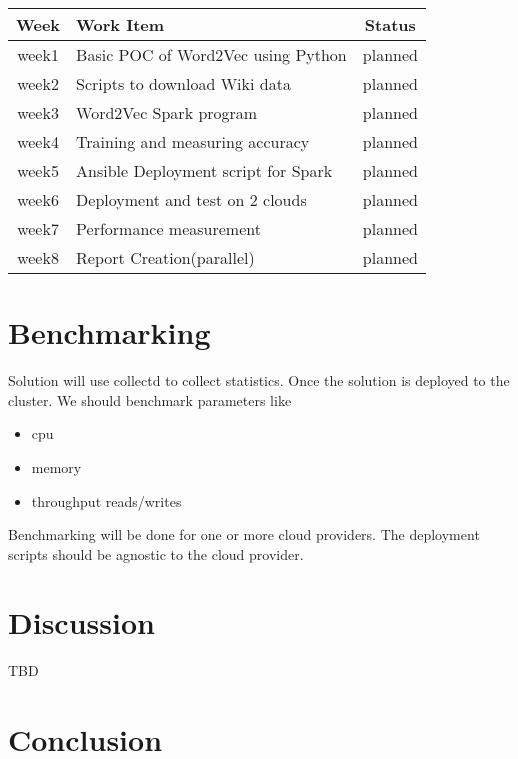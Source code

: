 \documentclass[9pt,twocolumn,twoside]{../../styles/osajnl}
\begin{document}
\begin{center}
\begin{tabular}{ |c|l|c| } 
 \hline
Week & Work Item & Status \\
\hline
week1 & Basic POC of Word2Vec using Python  & planned \\ 
week2 & Scripts to download Wiki data & planned \\ 
week3 & Word2Vec Spark program & planned \\ 
week4 & Training and measuring accuracy & planned \\ 
week5 &  Ansible Deployment script for Spark & planned \\ 
week6 & Deployment and test on 2 clouds & planned \\ 
week7 & Performance measurement  & planned \\ 
week8 & Report Creation(parallel) & planned \\ 
 \hline
\end{tabular}
\end{center}





\section{Benchmarking}
Solution will use collectd \cite{www-collectd} to collect statistics. Once the solution is deployed to the cluster. We should benchmark parameters like
\begin{itemize}[noitemsep]
\item cpu
\item memory
\item throughput reads/writes
\end{itemize}
Benchmarking will be done for one or more cloud providers. The deployment scripts should be agnostic to the cloud provider. 

\section{Discussion}
TBD

\section{Conclusion}
\end{document}
